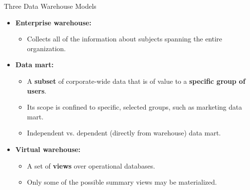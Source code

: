 \begin{frame}{Three Data Warehouse Models}
	\begin{itemize}
		\item \textbf{\color{airforceblue}Enterprise warehouse:}
		      \begin{itemize}
			      \item Collects all of the information about subjects spanning the entire organization.
		      \end{itemize}
		\item \textbf{\color{airforceblue}Data mart:}
		      \begin{itemize}
			      \item A \textbf{\color{airforceblue}subset} of corporate-wide data that is of value to a \textbf{\color{airforceblue}specific group of users}.
			      \item Its scope is confined to specific, selected groups, such as marketing data mart.
			      \item Independent vs. dependent (directly from warehouse) data mart.
		      \end{itemize}
		\item \textbf{\color{airforceblue}Virtual warehouse:}
		      \begin{itemize}
			      \item A set of \textbf{\color{airforceblue}views} over operational databases.
			      \item Only some of the possible summary views may be materialized.
		      \end{itemize}
	\end{itemize}
\end{frame}


